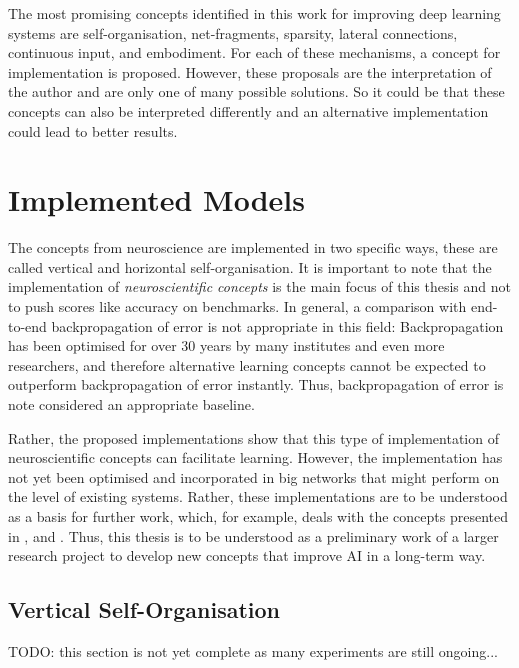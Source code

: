 The most promising concepts identified in this work for improving deep learning systems are self-organisation, net-fragments, sparsity, lateral connections, continuous input, and embodiment. For each of these mechanisms, a concept for implementation is proposed. However, these proposals are the interpretation of the author and are only one of many possible solutions. So it could be that these concepts can also be interpreted differently and an alternative implementation could lead to better results.


\section{Implemented Models}
The concepts from neuroscience are implemented in two specific ways, these are called vertical and horizontal self-organisation. It is important to note that the implementation of \emph{neuroscientific concepts} is the main focus of this thesis and not to push scores like accuracy on benchmarks. In general, a comparison with end-to-end backpropagation of error is not appropriate in this field: Backpropagation has been optimised for over 30 years by many institutes and even more researchers, and therefore alternative learning concepts cannot be expected to outperform backpropagation of error instantly. Thus, backpropagation of error is note considered an appropriate baseline.

Rather, the proposed implementations show that this type of implementation of neuroscientific concepts can facilitate learning. However, the implementation has not yet been optimised and incorporated in big networks that might perform on the level of existing systems. Rather, these implementations are to be understood as a basis for further work, which, for example, deals with the concepts presented in ,  and . Thus, this thesis is to be understood as a preliminary work of a larger research project to develop new concepts that improve AI in a long-term way.


\subsection{Vertical Self-Organisation}
TODO: this section is not yet complete as many experiments are still ongoing...


